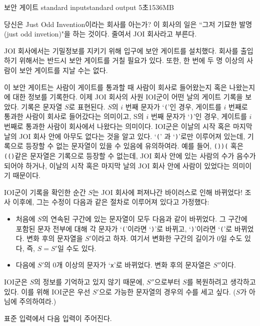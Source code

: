 \begin{problem}{보안 게이트}
	{standard input}{standard output}
	{5초}{1536MB}{}
	
	당신은 Just Odd Invention이라는 회사를 아는가? 이 회사의 일은 ``그저 기묘한 발명 (just odd invetion)"을 하는 것이다. 줄여서 JOI 회사라고 부른다.
	
	JOI 회사에서는 기밀정보를 지키기 위해 입구에 보안 게이트를 설치했다. 회사를 출입하기 위해서는 반드시 보안 게이트를 거칠 필요가 있다. 또한, 한 번에 두 명 이상의 사람이 보안 게이트를 지날 수는 없다.
	
	이 보안 게이트는 사람이 게이트를 통과할 때 사람이 회사로 들어왔는지 혹은 나왔는지에 대한 정보를 기록한다. 이제 JOI 회사의 사원 IOI군이 어떤 날의 게이트 기록을 보았다. 기록은 문자열 $S$로 표현된다. $S$의 $i$ 번째 문자가 `\texttt{(}'인 경우, 게이트를 $i$ 번째로 통과한 사람이 회사로 들어갔다는 의미이고, S의 $i$ 번째 문자가 `\texttt{)}'인 경우, 게이트를 $i$ 번째로 통과한 사람이 회사에서 나왔다는 의미이다. IOI군은 이날의 시작 혹은 마지막 날의 JOI 회사 안에 아무도 없다는 것을 알고 있다. `\texttt{(}' 과 `\texttt{)}'로만 이루어져 있는데, 기록으로 등장할 수 없는 문자열이 있을 수 있음에 유의하여라. 예를 들어, \texttt{())(} 혹은 \texttt{(()}같은 문자열은 기록으로 등장할 수 없는데, JOI 회사 안에 있는 사람의 수가 음수가 되어야 하거나, 이날의 시작 혹은 마지막 날의 JOI 회사 안에 사람이 있었다는 의미이기 때문이다.
	
	IOI군이 기록을 확인한 순간 $S$는 JOI 회사에 퍼져나간 바이러스로 인해 바뀌었다! 조사 이후에, 그는 수정이 다음과 같은 절차로 이루어져 있다고 가정했다:
	
	\begin{itemize}
		\item 처음에 $S$의 연속된 구간에 있는 문자열이 모두 다음과 같이 바뀌었다. 그 구간에 포함된 문자 전부에 대해 각 문자가 `\texttt{(}'이라면 `\texttt{)}'로 바뀌고, `\texttt{)}'이라면 `\texttt{(}'로 바뀌었다. 변화 후의 문자열을 $S'$이라고 하자. 여기서 변화한 구간의 길이가 0일 수도 있다, 즉, $S=S'$일 수도 있다.
		\item 다음에 $S'$의 0개 이상의 문자가 `\texttt{x}'로 바뀌었다. 변화 후의 문자열은 $S''$이다.
	\end{itemize}
	
	IOI군은 $S$의 정보를 기억하고 있지 않기 때문에, $S''$으로부터 $S$를 복원하려고 생각하고 있다. 이를 위해 IOI군은 우선 $S'$으로 가능한 문자열의 경우의 수를 세고 싶다. ($S$가 아님에 주의하여라.)
	
	\InputFile
	
	표준 입력에서 다음 입력이 주어진다.
	

\end{problem}
